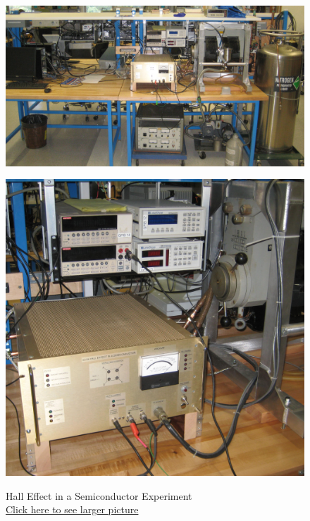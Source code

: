 \documentclass{../lab}
\begin{document}
\noindent
\begin{figure}[!htb]
  \href{http://experimentationlab.berkeley.edu/sites/default/files/images/SHE_3541_Crop.jpg}{\includegraphics[width=\linewidth,keepaspectratio]{images/SHE_3541_Crop.jpg}}
  \caption{Hall Effect in a Semiconductor Experiment \\ \href{http://experimentationlab.berkeley.edu/sites/default/files/images/SHE_3541_Crop.jpg}{Click here to see larger picture}}
  \label{fig:SHE_3541_Crop.jpg}
\endminipage\hfill
{}
  \href{http://experimentationlab.berkeley.edu/sites/default/files/images/SHE_Electronics_3546_Crop.jpg}{\includegraphics[width=\linewidth,keepaspectratio]{images/SHE_Electronics_3546_Crop.jpg}}

\end{figure}
\end{document}
